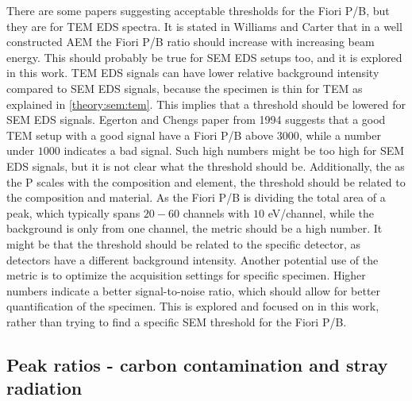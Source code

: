 There are some papers \cite{egerton_nio_characterization_1994,egerton_nio_characterization_1994,ted_pella_nio_tem_2019} suggesting acceptable thresholds for the Fiori P/B, but they are for TEM EDS spectra.
It is stated in Williams and Carter \cite[p. 614]{williams_carter_tem_2009} that in a well constructed AEM the Fiori P/B ratio should increase with increasing beam energy.
This should probably be true for SEM EDS setups too, and it is explored in this work.
TEM EDS signals can have lower relative background intensity compared to SEM EDS signals, because the specimen is thin for TEM as explained in \cref{theory:sem:tem}.
This implies that a threshold should be lowered for SEM EDS signals.
Egerton and Chengs paper from 1994 \cite{egerton_nio_characterization_1994} suggests that a good TEM setup with a good signal have a Fiori P/B above $3000$, while a number under $1000$ indicates a bad signal.
Such high numbers might be too high for SEM EDS signals, but it is not clear what the threshold should be.
Additionally, the as the P scales with the composition and element, the threshold should be related to the composition and material.
As the Fiori P/B is dividing the total area of a peak, which typically spans $20-60$ channels with $10$ eV/channel, while the background is only from one channel, the metric should be a high number.
It might be that the threshold should be related to the specific detector, as detectors have a different background intensity.
Another potential use of the metric is to optimize the acquisition settings for specific specimen.
Higher numbers indicate a better signal-to-noise ratio, which should allow for better quantification of the specimen.
This is explored and focused on in this work, rather than trying to find a specific SEM threshold for the Fiori P/B.



\subsection{Peak ratios - carbon contamination and stray radiation}
\label{theory:eds_performance:peakratio}

